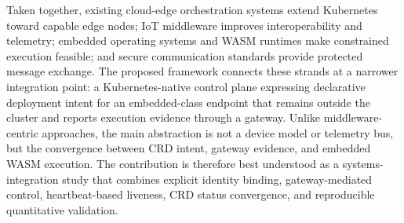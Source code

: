 Taken together, existing cloud-edge orchestration systems extend Kubernetes toward capable edge nodes; IoT middleware improves interoperability and telemetry; embedded operating systems and WASM runtimes make constrained execution feasible; and secure communication standards provide protected message exchange. The proposed framework connects these strands at a narrower integration point: a Kubernetes-native control plane expressing declarative deployment intent for an embedded-class endpoint that remains outside the cluster and reports execution evidence through a gateway. Unlike middleware-centric approaches, the main abstraction is not a device model or telemetry bus, but the convergence between CRD intent, gateway evidence, and embedded WASM execution. The contribution is therefore best understood as a systems-integration study that combines explicit identity binding, gateway-mediated control, heartbeat-based liveness, CRD status convergence, and reproducible quantitative validation.
